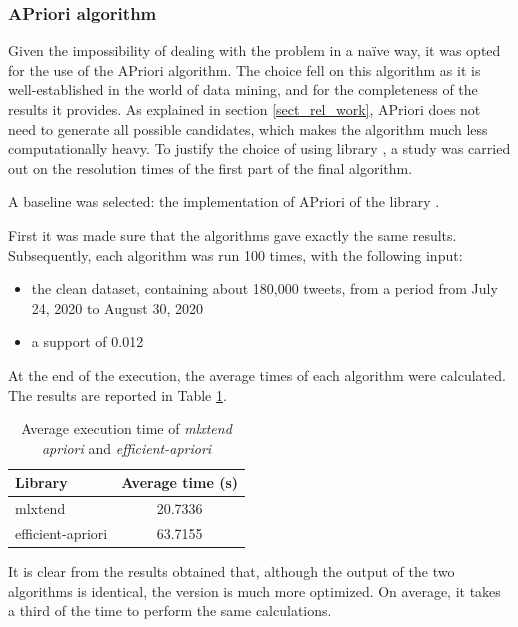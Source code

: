 \subsubsection*{APriori algorithm}
Given the impossibility of dealing with the problem in a naïve way, it was opted for the use of the APriori algorithm. The choice fell on this algorithm as it is well-established in the world of data mining, and for the completeness of the results it provides. As explained in section \ref{sect_rel_work}, APriori does not need to generate all possible candidates, which makes the algorithm much less computationally heavy. To justify the choice of using library , a study was carried out on the resolution times of the first part of the final algorithm.

A baseline was selected: the implementation of APriori of the library \cite{eff_apr}.

First it was made sure that the algorithms gave exactly the same results. Subsequently, each algorithm was run 100 times, with the following input:
\begin{itemize}
  \item the clean dataset, containing about 180,000 tweets, from a period from July 24, 2020 to August 30, 2020
  \item a support of 0.012
\end{itemize}

At the end of the execution, the average times of each algorithm were calculated. The results are reported in Table \ref{tab_apriori_times}.

\begin{table}[h]
  \centering
  \begin{tabular}{@{}lc@{}}
  \toprule
  \textbf{Library}     & \textbf{Average time (s)}                                         \\ \midrule
  mlxtend              & 20.7336 \\
  efficient-apriori    & 63.7155 \\ \bottomrule
  \end{tabular}
  \caption{Average execution time of \textit{mlxtend apriori} and \textit{efficient-apriori}}
  \label{tab_apriori_times}
\end{table}

It is clear from the results obtained that, although the output of the two algorithms is identical, the  version is much more optimized. On average, it takes a third of the time to perform the same calculations.


